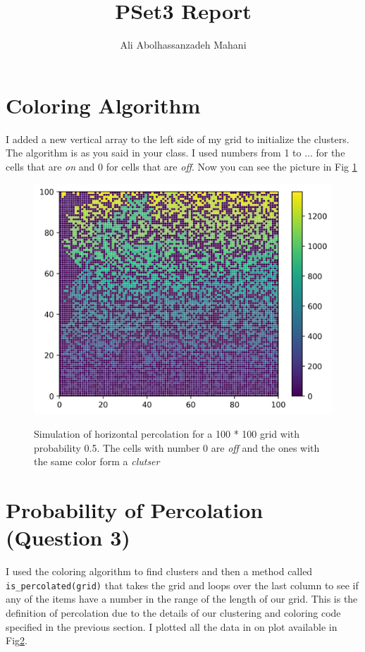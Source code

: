 \documentclass[12pt]{article}
\title{PSet3 Report}
\author{Ali Abolhassanzadeh Mahani}
\begin{document}
	\maketitle
	
	\section{Coloring Algorithm}
	I added a new vertical array to the left side of my grid to initialize the clusters. The algorithm is as you said
	in your class. I used numbers from 1 to ... for the cells that are \emph{on} and 0 for cells that are \emph{off}.
	Now you can see the picture in Fig \ref{fig:Color}
	\begin{figure}[h!]
		\centering
		\includegraphics[width=0.9\linewidth]{../p2/colored.jpg}
		\label{fig:Color}
		\caption{Simulation of horizontal percolation for a 100 * 100 grid with probability 0.5. The cells with number 0 are \emph{off} and the ones with the same color form a \emph{clutser}}
	\end{figure}
	
	\section{Probability of Percolation (Question 3)}
	I used the coloring algorithm to find clusters and then a method called \texttt{is\_percolated(grid)} that takes the grid and loops over the last
	column to see if any of the items have a number in the range of the length of our grid. This is the definition of percolation due to the details of
	our clustering and coloring code specified in the previous section.
	I plotted all the data in on plot available in Fig\ref{}.
	
\end{document}
